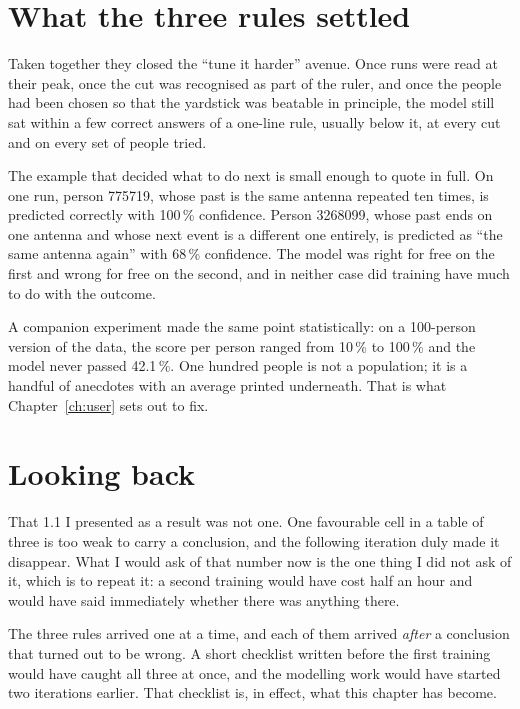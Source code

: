 \section{What the three rules settled}

Taken together they closed the ``tune it harder'' avenue. Once runs were read at
their peak, once the cut was recognised as part of the ruler, and once the people
had been chosen so that the yardstick was beatable in principle, the model still
sat within a few correct answers of a one-line rule, usually below it, at every
cut and on every set of people tried.

The example that decided what to do next is small enough to quote in full. On one
run, person 775719, whose past is the same antenna repeated ten times, is
predicted correctly with 100\,\% confidence. Person 3268099, whose past ends on
one antenna and whose next event is a different one entirely, is predicted as
``the same antenna again'' with 68\,\% confidence. The model was right for free
on the first and wrong for free on the second, and in neither case did training
have much to do with the outcome.

A companion experiment made the same point statistically: on a 100-person version
of the data, the score per person ranged from 10\,\% to 100\,\% and the model
never passed 42.1\,\%. One hundred people is not a population; it is a handful of
anecdotes with an average printed underneath. That is what Chapter~\ref{ch:user}
sets out to fix.

\section{Looking back}
\label{sec:retro-first}

That 1.1 I presented as a result was not one. One favourable cell in a table of
three is too weak to carry a conclusion, and the following iteration duly made it
disappear. What I would ask of that number now is the one thing I did not ask of
it, which is to repeat it: a second training would have cost half an hour and
would have said immediately whether there was anything there.

The three rules arrived one at a time, and each of them arrived \emph{after} a
conclusion that turned out to be wrong. A short checklist written before the
first training would have caught all three at once, and the modelling work would
have started two iterations earlier. That checklist is, in effect, what this
chapter has become.
